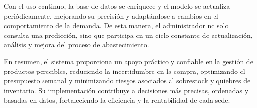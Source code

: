Con el uso continuo, la base de datos se enriquece y el modelo se actualiza periódicamente, mejorando su precisión y adaptándose a cambios en el comportamiento de la demanda. De esta manera, el administrador no solo consulta una predicción, sino que participa en un ciclo constante de actualización, análisis y mejora del proceso de abastecimiento.

En resumen, el sistema proporciona un apoyo práctico y confiable en la gestión de productos perecibles, reduciendo la incertidumbre en la compra, optimizando el presupuesto semanal y minimizando riesgos asociados al sobrestock y quiebres de inventario. Su implementación contribuye a decisiones más precisas, ordenadas y basadas en datos, fortaleciendo la eficiencia y la rentabilidad de cada sede.




		
	
